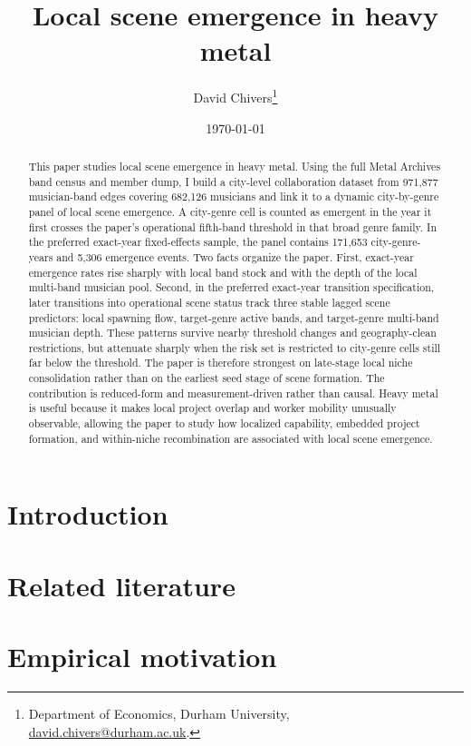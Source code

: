 \documentclass[11pt]{article}
\title{Local scene emergence in heavy metal}
\author{David Chivers\thanks{Department of Economics, Durham University, \href{mailto:david.chivers@durham.ac.uk}{david.chivers@durham.ac.uk}.}}
\date{\today}
\begin{document}
\maketitle

\begin{abstract}
This paper studies local scene emergence in heavy metal. Using the full Metal Archives band census
and member dump, I build a city-level collaboration dataset from 971,877 musician-band edges
covering 682,126 musicians and link it to a dynamic city-by-genre panel of local scene emergence.
A city-genre cell is counted as emergent in the year it first crosses the paper's operational
fifth-band threshold in that broad genre family. In the preferred exact-year fixed-effects sample,
the panel contains 171,653 city-genre-years and 5,306 emergence events. Two facts organize the
paper. First, exact-year emergence rates rise sharply with local band stock and with the depth of
the local multi-band musician pool. Second, in the preferred exact-year transition specification,
later transitions into operational scene status track three stable lagged scene predictors: local
spawning flow, target-genre active bands, and target-genre multi-band musician depth. These
patterns survive nearby threshold changes and geography-clean restrictions, but attenuate sharply
when the risk set is restricted to city-genre cells still far below the threshold. The paper is
therefore strongest on late-stage local niche consolidation rather than on the earliest seed stage
of scene formation. The contribution is reduced-form and measurement-driven rather than causal.
Heavy metal is useful because it makes local project overlap and worker mobility unusually
observable, allowing the paper to study how localized capability, embedded project formation, and
within-niche recombination are associated with local scene emergence.
\end{abstract}

\section{Introduction}


\section{Related literature}


\section{Empirical motivation}

\clearpage
\end{document}
